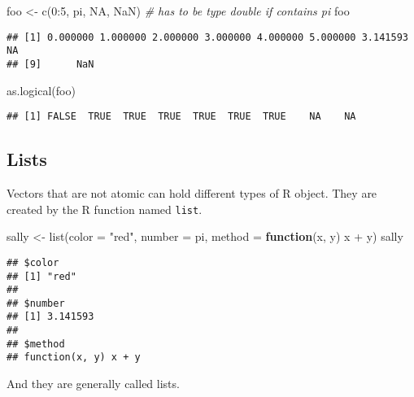\documentclass[
]{article}
\newenvironment{Shaded}{\begin{snugshade}}{\end{snugshade}}
\newcommand{\AttributeTok}[1]{\textcolor[rgb]{0.77,0.63,0.00}{#1}}
\newcommand{\CommentTok}[1]{\textcolor[rgb]{0.56,0.35,0.01}{\textit{#1}}}
\newcommand{\ConstantTok}[1]{\textcolor[rgb]{0.00,0.00,0.00}{#1}}
\newcommand{\ControlFlowTok}[1]{\textcolor[rgb]{0.13,0.29,0.53}{\textbf{#1}}}
\newcommand{\DecValTok}[1]{\textcolor[rgb]{0.00,0.00,0.81}{#1}}
\newcommand{\FunctionTok}[1]{\textcolor[rgb]{0.00,0.00,0.00}{#1}}
\newcommand{\NormalTok}[1]{#1}
\newcommand{\OtherTok}[1]{\textcolor[rgb]{0.56,0.35,0.01}{#1}}
\newcommand{\SpecialCharTok}[1]{\textcolor[rgb]{0.00,0.00,0.00}{#1}}
\newcommand{\StringTok}[1]{\textcolor[rgb]{0.31,0.60,0.02}{#1}}
\begin{document}
\begin{Shaded}
\begin{Highlighting}[]
\NormalTok{foo }\OtherTok{\textless{}{-}} \FunctionTok{c}\NormalTok{(}\DecValTok{0}\SpecialCharTok{:}\DecValTok{5}\NormalTok{, pi, }\ConstantTok{NA}\NormalTok{, }\ConstantTok{NaN}\NormalTok{)}
\CommentTok{\# has to be type double if contains pi}
\NormalTok{foo}
\end{Highlighting}
\end{Shaded}

\begin{verbatim}
## [1] 0.000000 1.000000 2.000000 3.000000 4.000000 5.000000 3.141593       NA
## [9]      NaN
\end{verbatim}

\begin{Shaded}
\begin{Highlighting}[]
\FunctionTok{as.logical}\NormalTok{(foo)}
\end{Highlighting}
\end{Shaded}

\begin{verbatim}
## [1] FALSE  TRUE  TRUE  TRUE  TRUE  TRUE  TRUE    NA    NA
\end{verbatim}

\hypertarget{lists}{%
\subsection{Lists}\label{lists}}

Vectors that are not atomic can hold different types of R object. They
are created by the R function named \texttt{list}.

\begin{Shaded}
\begin{Highlighting}[]
\NormalTok{sally }\OtherTok{\textless{}{-}} \FunctionTok{list}\NormalTok{(}\AttributeTok{color =} \StringTok{"red"}\NormalTok{, }\AttributeTok{number =}\NormalTok{ pi,}
    \AttributeTok{method =} \ControlFlowTok{function}\NormalTok{(x, y) x }\SpecialCharTok{+}\NormalTok{ y)}
\NormalTok{sally}
\end{Highlighting}
\end{Shaded}

\begin{verbatim}
## $color
## [1] "red"
## 
## $number
## [1] 3.141593
## 
## $method
## function(x, y) x + y
\end{verbatim}

And they are generally called lists.
\end{document}
